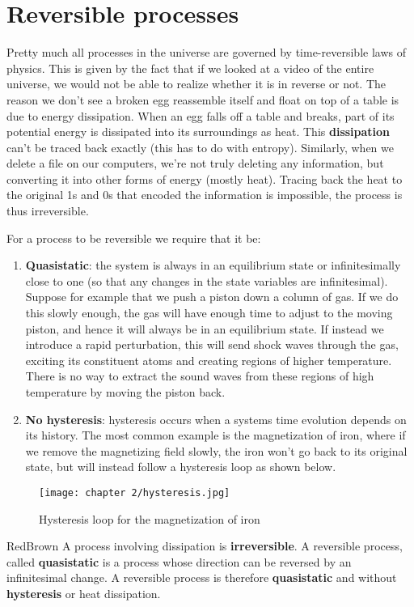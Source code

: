 \documentclass[a4paper,11pt,oneside]{book}
\begin{document}
\section{Reversible processes}
Pretty much all processes in the universe are governed by time-reversible laws of physics. This is given by the fact that if we looked at a video of the entire universe, we would not be able to realize whether it is in reverse or not.  The reason we don't see a broken egg reassemble itself and float on top of a table is due to energy dissipation. When an egg falls off a table and breaks, part of its potential energy is dissipated into its surroundings as heat. This \textbf{dissipation} can't be traced back exactly (this has to do with entropy). Similarly, when we delete a file on our computers, we're not truly deleting any information, but converting it into other forms of energy (mostly heat). Tracing back the heat to the original 1s and 0s that encoded the information is impossible, the process is thus irreversible. 

For a process to be reversible we require that it be:
\begin{enumerate}
    \item \textbf{Quasistatic}: the system is always in an equilibrium state or infinitesimally close to one (so that any changes in the state variables are infinitesimal). Suppose for example that we push a piston down a column of gas. If we do this slowly enough, the gas will have enough time to adjust to the moving piston, and hence it will always be in an equilibrium state. If instead we introduce a rapid perturbation, this will send shock waves through the gas, exciting its constituent atoms and creating regions of higher temperature. There is no way to extract the sound waves from these regions of high temperature by moving the piston back.
    \item \textbf{No hysteresis}: hysteresis occurs when a systems time evolution depends on its history. The most common example is the magnetization of iron, where if we remove the magnetizing field slowly, the iron won't go back to its original state, but will instead follow a hysteresis loop as shown below.
\end{enumerate}
\begin{figure}[h!]
    \centering
    \texttt{[image: chapter 2/hysteresis.jpg]}
    \caption{Hysteresis loop for the magnetization of iron}
    \label{fig:my_label}
\end{figure}

\begin{mybox}{RedBrown}{\textbf{}}
A process involving dissipation is \textbf{irreversible}. 
A reversible process, called \textbf{quasistatic} is a process whose direction can be reversed by an infinitesimal change. A reversible process is therefore \textbf{quasistatic} and without \textbf{hysteresis} or heat dissipation. 
\end{mybox}
\end{document}
